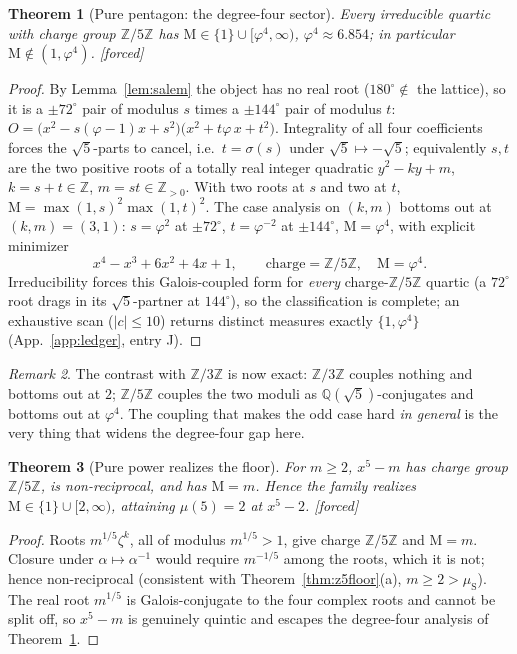 \documentclass[11pt]{article}
\newtheorem{theorem}{Theorem}[section]
\theoremstyle{definition}
\theoremstyle{remark}
\newtheorem{remark}[theorem]{Remark}
\newcommand{\Mah}{\mathrm{M}}
\newcommand{\Z}{\mathbb{Z}}
\newcommand{\Q}{\mathbb{Q}}
\newcommand{\gold}{\varphi}
\newcommand{\Zmod}[1]{\Z/#1\Z}
\newcommand{\status}[1]{{\small\textsf{[#1]}}}
\newcommand{\forced}{\status{forced}}
\newcommand{\muS}{\mu_{\mathrm{S}}}
\begin{document}
\begin{theorem}[Pure pentagon: the degree-four sector]\label{thm:pentagon}
Every irreducible quartic with charge group $\Zmod5$ has $\Mah\in\{1\}\cup[\gold^{4},\infty)$,
$\gold^{4}\approx6.854$; in particular $\Mah\notin(1,\gold^{4})$. \forced{}
\end{theorem}
\begin{proof}
By Lemma~\ref{lem:salem} the object has no real root ($180^\circ\notin$ the lattice), so it is a
$\pm72^\circ$ pair of modulus $s$ times a $\pm144^\circ$ pair of modulus $t$:
$O=\bigl(x^2-s(\gold-1)x+s^2\bigr)\bigl(x^2+t\gold\,x+t^2\bigr)$. Integrality of all four
coefficients forces the $\sqrt5$-parts to cancel, i.e.\ $t=\sigma(s)$ under
$\sqrt5\mapsto-\sqrt5$; equivalently $s,t$ are the two positive roots of a totally real integer
quadratic $y^2-ky+m$, $k=s+t\in\Z$, $m=st\in\Z_{>0}$. With two roots at $s$ and two at $t$,
$\Mah=\max(1,s)^2\max(1,t)^2$. The case analysis on $(k,m)$ bottoms out at $(k,m)=(3,1)$:
$s=\gold^{2}$ at $\pm72^\circ$, $t=\gold^{-2}$ at $\pm144^\circ$, $\Mah=\gold^{4}$, with explicit
minimizer
\[
x^4-x^3+6x^2+4x+1,\qquad \text{charge}=\Zmod5,\quad \Mah=\gold^{4}.
\]
Irreducibility forces this Galois-coupled form for \emph{every} charge-$\Zmod5$ quartic (a
$72^\circ$ root drags in its $\sqrt5$-partner at $144^\circ$), so the classification is
complete; an exhaustive scan ($|c|\le10$) returns distinct measures exactly $\{1,\gold^{4}\}$
(App.~\ref{app:ledger}, entry J).
\end{proof}
\begin{remark}
The contrast with $\Zmod3$ is now exact: $\Zmod3$ couples nothing and bottoms out at $2$;
$\Zmod5$ couples the two moduli as $\Q(\sqrt5)$-conjugates and bottoms out at $\gold^{4}$. The
coupling that makes the odd case hard \emph{in general} is the very thing that widens the
degree-four gap here.
\end{remark}

\begin{theorem}[Pure power realizes the floor]\label{thm:z5pure}
For $m\ge2$, $x^{5}-m$ has charge group $\Zmod5$, is non-reciprocal, and has $\Mah=m$. Hence the
family realizes $\Mah\in\{1\}\cup[2,\infty)$, attaining $\mu(5)=2$ at $x^{5}-2$. \forced{}
\end{theorem}
\begin{proof}
Roots $m^{1/5}\zeta^{k}$, all of modulus $m^{1/5}>1$, give charge $\Zmod5$ and $\Mah=m$. Closure
under $\alpha\mapsto\alpha^{-1}$ would require $m^{-1/5}$ among the roots, which it is not; hence
non-reciprocal (consistent with Theorem~\ref{thm:z5floor}(a), $m\ge2>\muS$). The real root
$m^{1/5}$ is Galois-conjugate to the four complex roots and cannot be split off, so $x^{5}-m$ is
genuinely quintic and escapes the degree-four analysis of Theorem~\ref{thm:pentagon}.
\end{proof}
\end{document}
